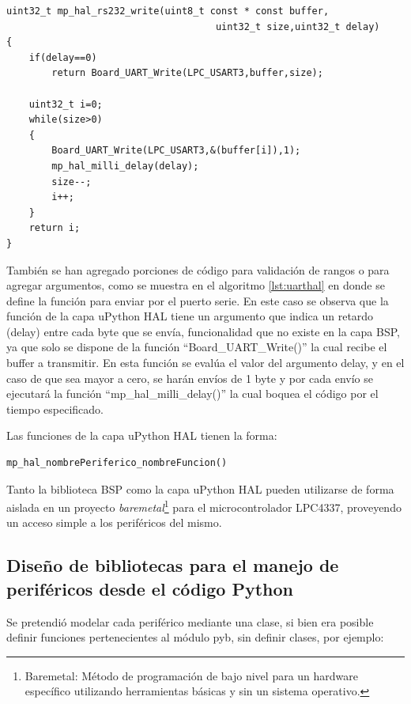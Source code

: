 \begin{lstlisting}[label={lst:uarthal},caption=Función de envío por la UART de la capa uPython HAL] 
uint32_t mp_hal_rs232_write(uint8_t const * const buffer, 
                                     uint32_t size,uint32_t delay)
{
    if(delay==0)
        return Board_UART_Write(LPC_USART3,buffer,size);

    uint32_t i=0;
    while(size>0)
    {
        Board_UART_Write(LPC_USART3,&(buffer[i]),1);
        mp_hal_milli_delay(delay);
        size--;
        i++;
    }
    return i;
}
\end{lstlisting}

También se han agregado porciones de código para validación de rangos o para agregar argumentos, como se muestra en el algoritmo \ref{lst:uarthal} en donde se define la función para enviar por el puerto serie.
En este caso se observa que la función de la capa uPython HAL tiene un argumento que indica un retardo (delay) entre cada byte que se envía, funcionalidad que no existe en la capa BSP, ya que solo se dispone de la función “Board\_UART\_Write()” la cual recibe el buffer a transmitir.
En esta función se evalúa el valor del argumento delay, y en el caso de que sea mayor a cero, se harán envíos de 1 byte y por cada envío se ejecutará la función “mp\_hal\_milli\_delay()” la cual boquea el código por el tiempo especificado.

Las funciones de la capa uPython HAL tienen la forma:

\begin{verbatim}
mp_hal_nombrePeriferico_nombreFuncion()
\end{verbatim}

Tanto la biblioteca BSP como la capa uPython HAL pueden utilizarse de forma aislada en un proyecto \textit{baremetal}\footnote{Baremetal: Método de programación de bajo nivel para un hardware específico utilizando herramientas básicas y sin un sistema operativo.} para el microcontrolador LPC4337, proveyendo un acceso simple a los periféricos del mismo.


\subsection{Diseño de bibliotecas para el manejo de periféricos desde el código Python}

Se pretendió modelar cada periférico mediante una clase, si bien era posible definir funciones pertenecientes al módulo pyb, sin definir clases, por ejemplo:

